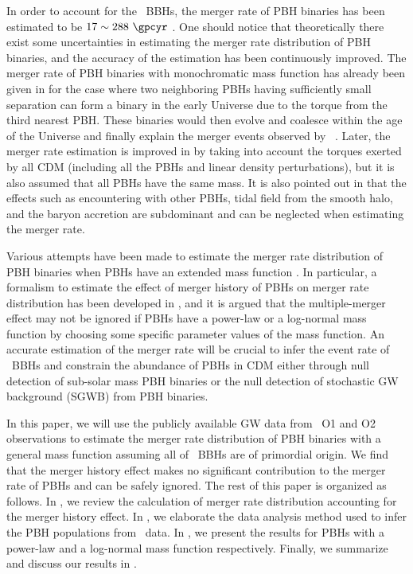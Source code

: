 \documentclass[
reprint,           %
superscriptaddress,%
amsmath,           %
amssymb,           %
aps,               %
prd,               %
notitlepage,       %
longbibliography,  %
floatfix,          %
showkeys,          %
]{revtex4-1}
\begin{document}
In order to account for the \lvc\ BBHs, the merger rate of PBH binaries has
been estimated to be $17 \sim 288~\gpcyr$ \cite{Chen:2018rzo}.
One should notice that theoretically there exist some uncertainties in
estimating the merger rate distribution of PBH binaries, and the accuracy of 
the estimation has been continuously improved.
The merger rate of PBH binaries with monochromatic mass function has already
been given in \cite{Nakamura:1997sm,Sasaki:2016jop} for the case where two 
neighboring PBHs having sufficiently small separation can form a binary in
the early Universe due to the torque from the third nearest PBH.
These binaries would then evolve and coalesce within the age of the Universe 
and finally explain the merger events observed by \lvc\
\cite{Sasaki:2016jop}.
Later, the merger rate estimation is improved in \cite{Ali-Haimoud:2017rtz} 
by taking into account the torques exerted by all CDM (including all the PBHs
and linear density perturbations), but it is also assumed that all PBHs have
the same mass.
It is also pointed out in \cite{Ali-Haimoud:2017rtz} that the effects such as
encountering with other PBHs, tidal field from the smooth halo, and
the baryon accretion are subdominant and can be neglected when estimating
the merger rate.

Various attempts have been made to estimate the merger rate distribution
of PBH binaries when PBHs have an extended mass function 
\cite{Chen:2018czv,Chen:2018rzo,Raidal:2018bbj,Raidal:2017mfl,Liu:2018ess,Liu:2020cds,Vaskonen:2019jpv}.
In particular, a formalism to estimate the effect of merger history of PBHs
on merger rate distribution has been developed in \cite{Liu:2019rnx},
and it is argued that the multiple-merger effect may not be ignored if
PBHs have a power-law or a log-normal mass function by choosing some specific
parameter values of the mass function.
An accurate estimation of the merger rate will be crucial to infer the event
rate of \lvc\ BBHs and constrain the abundance of PBHs in CDM either through
null detection of sub-solar mass PBH binaries or the null detection
of stochastic GW background (SGWB) from PBH binaries.

In this paper, we will use the publicly available GW data from \lvc\ O1 and O2 
observations to estimate the merger rate distribution of PBH binaries with a
general mass function assuming all of \lvc\ BBHs are of primordial origin.
We find that the merger history effect makes no significant contribution to
the merger rate of PBHs and can be safely ignored.
The rest of this paper is organized as follows.
In , we review the calculation of merger rate distribution 
accounting for the merger history effect.
In , we elaborate the data analysis method used to infer the
PBH populations from \lvc\ data.
In , we present the results for PBHs with a power-law and 
a log-normal mass function respectively.
Finally, we summarize and discuss our results in .
\end{document}
